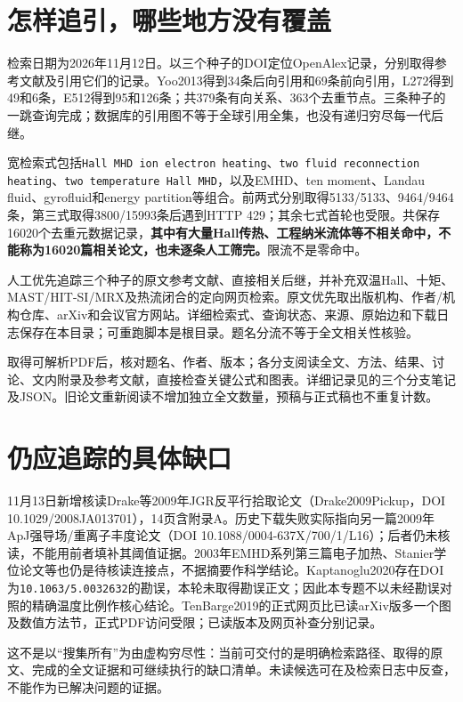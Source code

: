 \documentclass[UTF8,a4paper,11pt,openany,fontset=fandol]{ctexbook}
\begin{document}
\section{怎样追引，哪些地方没有覆盖}
检索日期为2026年11月12日。以三个种子的DOI定位OpenAlex记录，分别取得参考文献及引用它们的记录。Yoo2013得到34条后向引用和69条前向引用，L272得到49和6条，E512得到95和126条；共379条有向关系、363个去重节点。三条种子的一跳查询完成；数据库的引用图不等于全球引用全集，也没有递归穷尽每一代后继。

宽检索式包括\texttt{Hall MHD ion electron heating}、\texttt{two fluid reconnection heating}、\texttt{two temperature Hall MHD}，以及EMHD、ten moment、Landau fluid、gyrofluid和energy partition等组合。前两式分别取得5133/5133、9464/9464条，第三式取得3800/15993条后遇到HTTP 429；其余七式首轮也受限。共保存16020个去重元数据记录，\textbf{其中有大量Hall传热、工程纳米流体等不相关命中，不能称为16020篇相关论文，也未逐条人工筛完。}限流不是零命中。

人工优先追踪三个种子的原文参考文献、直接相关后继，并补充双温Hall、十矩、MAST/HIT-SI/MRX及热流闭合的定向网页检索。原文优先取出版机构、作者/机构仓库、arXiv和会议官方网站。详细检索式、查询状态、来源、原始边和下载日志保存在本目录；可重跑脚本是根目录。题名分流不等于全文相关性核验。

取得可解析PDF后，核对题名、作者、版本；各分支阅读全文、方法、结果、讨论、文内附录及参考文献，直接检查关键公式和图表。详细记录见的三个分支笔记及JSON。旧论文重新阅读不增加独立全文数量，预稿与正式稿也不重复计数。

\section{仍应追踪的具体缺口}
11月13日新增核读Drake等2009年JGR反平行拾取论文（Drake2009Pickup，DOI 10.1029/2008JA013701），14页含附录A。历史下载失败实际指向另一篇2009年ApJ强导场/重离子丰度论文（DOI 10.1088/0004-637X/700/1/L16）；后者仍未核读，不能用前者填补其阈值证据。2003年EMHD系列第三篇电子加热、Stanier学位论文等也仍是待核读连接点，不据摘要作科学结论。Kaptanoglu2020存在DOI为\texttt{10.1063/5.0032632}的勘误，本轮未取得勘误正文；因此本专题不以未经勘误对照的精确温度比例作核心结论。TenBarge2019的正式网页比已读arXiv版多一个图及数值方法节，正式PDF访问受限；已读版本及网页补查分别记录。

这不是以“搜集所有”为由虚构穷尽性：当前可交付的是明确检索路径、取得的原文、完成的全文证据和可继续执行的缺口清单。未读候选可在及检索日志中反查，不能作为已解决问题的证据。
\end{document}
